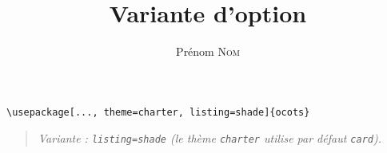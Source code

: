 \documentclass[11pt]{ocots-book}
\title{Variante d'option}
\author{Prénom \textsc{Nom}}
\newcommand{\ocotsvariantnote}[1]{\begin{quote}\itshape Variante : #1\end{quote}}
\begin{document}
\maketitle

\begin{lstlisting}
\usepackage[..., theme=charter, listing=shade]{ocots}
\end{lstlisting}
\ocotsvariantnote{\texttt{listing=shade} (le th\`eme \texttt{charter} utilise par d\'efaut \texttt{card}).}

\end{document}
